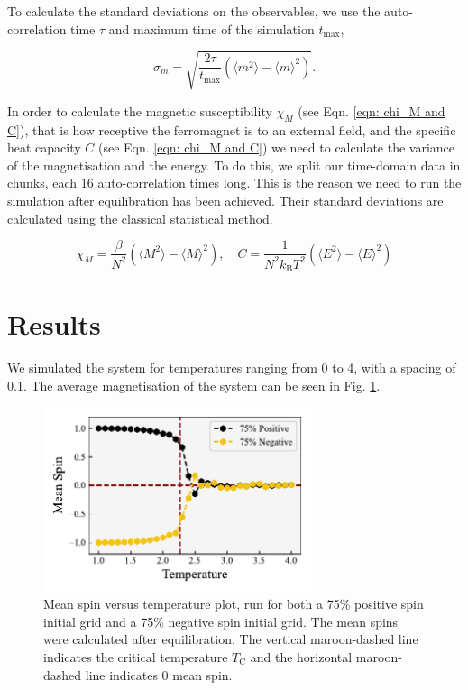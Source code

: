 \documentclass{IAYCPro}
\begin{document}
To calculate the standard deviations on the observables, we use the auto-correlation time $\tau$ and maximum time of the simulation $t_\mathrm{max}$,

\begin{equation}
    \sigma_m = \sqrt{\frac{2\tau}{t_\mathrm{max}} (\langle m^2 \rangle - \langle m\rangle^2)}.
\label{eq:sigma}
\end{equation}

In order to calculate the magnetic susceptibility $\chi_M$ (see Eqn. \ref{eqn: chi_M and C}), that is how receptive the ferromagnet is to an external field, and the specific heat capacity $C$ (see Eqn. \ref{eqn: chi_M and C}) we need to calculate the variance of the magnetisation and the energy. To do this, we split our time-domain data in chunks, each 16 auto-correlation times long. This is the reason we need to run the simulation after equilibration has been achieved. Their standard deviations are calculated using the classical statistical method.

\begin{equation}
    \chi_M = \frac{\beta}{N^2}\left(\langle M^2\rangle - \langle M \rangle^2\right),\quad 
    C = \frac{1}{N^2k_\mathrm{B}T^2}\left(\langle E^2\rangle - \langle E \rangle^2\right)
    \label{eqn: chi_M and C}
\end{equation}

\raggedbottom
\newpage

\section{Results}
\label{sct: Results}

We simulated the system for temperatures ranging from 0 to 4, with a spacing of 0.1. The average magnetisation of the system can be seen in Fig. \ref{fig:pitchfork}.

\begin{figure}[H]
    \centering
    \includegraphics[width=0.7\textwidth]{figs/Pitchfork.pdf}
    \caption{Mean spin versus temperature plot, run for both a 75\% positive spin initial grid and a 75\% negative spin initial grid. The mean spins were calculated after equilibration. The vertical maroon-dashed line indicates the critical temperature $T_\mathrm{C}$ and the horizontal maroon-dashed line indicates 0 mean spin.}
    \label{fig:pitchfork}
\end{figure}
\end{document}
